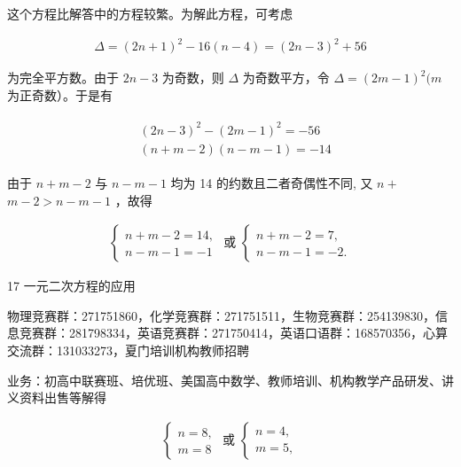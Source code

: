 \documentclass[10pt]{article}
\begin{document}
这个方程比解答中的方程较繁。为解此方程，可考虑

\begin{align*}
\Delta=(2 n+1)^{2}-16(n-4)=(2 n-3)^{2}+56
\end{align*}

为完全平方数。由于 $2 n-3$ 为奇数，则 $\Delta$ 为奇数平方，令 $\Delta=(2 m-1)^{2}(m$ 为正奇数）。于是有

\begin{align*}
\begin{aligned}
& (2 n-3)^{2}-(2 m-1)^{2}=-56 \\
& (n+m-2)(n-m-1)=-14
\end{aligned}
\end{align*}

由于 $n+m-2$ 与 $n-m-1$ 均为 14 的约数且二者奇偶性不同, 又 $n+$ $m-2>n-m-1$ ，故得

\begin{align*}
\left\{\begin{array} { l } 
{ n + m - 2 = 1 4 , } \\
{ n - m - 1 = - 1 }
\end{array} \text { 或 } \left\{\begin{array}{l}
n+m-2=7, \\
n-m-1=-2 .
\end{array}\right.\right.
\end{align*}

17 一元二次方程的应用

物理竞赛群：271751860，化学竞赛群：271751511，生物竞赛群：254139830，信息竞赛群：281798334，英语竞赛群：271750414，英语口语群：168570356，心算交流群：131033273，夏门培训机构教师招聘

业务：初高中联赛班、培优班、美国高中数学、教师培训、机构教学产品研发、讲义资料出售等解得

\begin{align*}
\left\{\begin{array} { l } 
{ n = 8 , } \\
{ m = 8 }
\end{array} \text { 或 } \left\{\begin{array}{l}
n=4, \\
m=5,
\end{array}\right.\right.
\end{align*}
\end{document}
